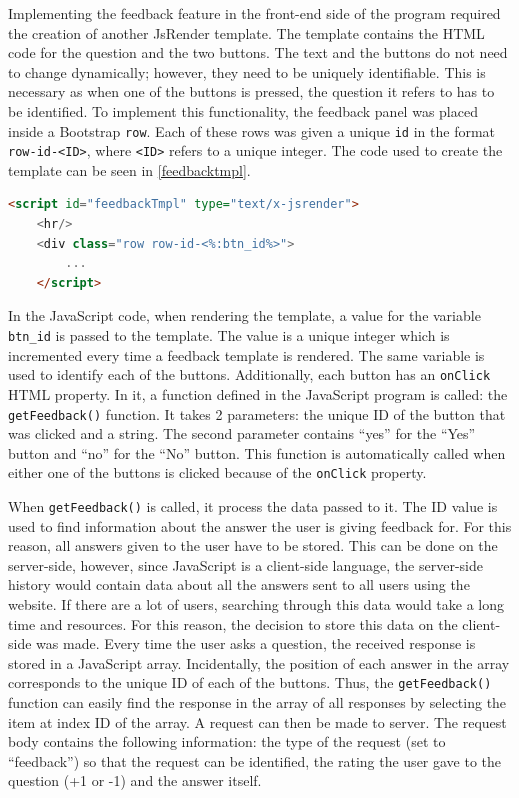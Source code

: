 \documentclass[12pt,a4paper]{article}
\newcommand{\captionstyle}[1] {
    \small{#1}
}
\begin{document}
Implementing the feedback feature in the front-end side of the program required the creation of another JsRender template. The template contains the HTML code for the question and the two buttons. The text and the buttons do not need to change dynamically; however, they need to be uniquely identifiable. This is necessary as when one of the buttons is pressed, the question it refers to has to be identified. To implement this functionality, the feedback panel was placed inside a Bootstrap \texttt{row}. Each of these rows was given a unique \texttt{id} in the format \texttt{row-id-<ID>}, where \texttt{<ID>} refers to a unique integer. The code used to create the template can be seen in \cref{feedbacktmpl}. 

\begin{lstlisting}[language=html, caption={\captionstyle{The JsRender template used to generate HTML code for a feedback panel.}}, label={lst:feedbacktmpl}]
    <script id="feedbackTmpl" type="text/x-jsrender">
    <hr/>
    <div class="row row-id-<%:btn_id%>">
        ...
    </script>
    \end{lstlisting}

In the JavaScript code, when rendering the template, a value for the variable \texttt{btn\_id} is passed to the template. The value is a unique integer which is incremented every time a feedback template is rendered. The same variable is used to identify each of the buttons. Additionally, each button has an \texttt{onClick} HTML property. In it, a function defined in the JavaScript program is called: the \texttt{getFeedback()} function. It takes 2 parameters: the unique ID of the button that was clicked and a string. The second parameter contains “yes” for the “Yes” button and “no” for the “No” button. This function is automatically called when either one of the buttons is clicked because of the \texttt{onClick} property. 

When \texttt{getFeedback()} is called, it process the data passed to it. The ID value is used to find information about the answer the user is giving feedback for. For this reason, all answers given to the user have to be stored. This can be done on the server-side, however, since JavaScript is a client-side language, the server-side history would contain data about all the answers sent to all users using the website. If there are a lot of users, searching through this data would take a long time and resources. For this reason, the decision to store this data on the client-side was made. Every time the user asks a question, the received response is stored in a JavaScript array. Incidentally, the position of each answer in the array corresponds to the unique ID of each of the buttons. Thus, the \texttt{getFeedback()} function can easily find the response in the array of all responses by selecting the item at index ID of the array. A request can then be made to server. The request body contains the following information: the type of the request (set to “feedback”) so that the request can be identified, the rating the user gave to the question (+1 or -1) and the answer itself. 
\end{document}
